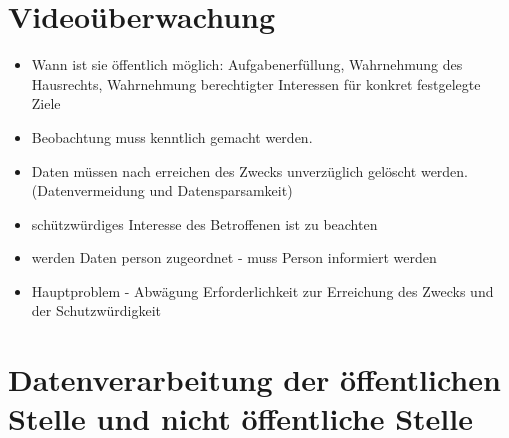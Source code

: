 \documentclass[a4paper,10pt]{scrartcl}
\begin{document}
\section{Videoüberwachung }

\begin{itemize}
 \item Wann ist sie öffentlich möglich: Aufgabenerfüllung, Wahrnehmung des Hausrechts, Wahrnehmung berechtigter Interessen 
 für konkret festgelegte Ziele
 \item Beobachtung muss kenntlich gemacht werden.
 \item Daten müssen nach erreichen des Zwecks unverzüglich gelöscht werden. (Datenvermeidung und Datensparsamkeit)
 \item schützwürdiges Interesse des Betroffenen ist zu beachten 
 \item werden Daten person zugeordnet - muss Person informiert werden
 \item Hauptproblem - Abwägung Erforderlichkeit zur Erreichung des Zwecks und der Schutzwürdigkeit
\end{itemize}



\section{ Datenverarbeitung der öffentlichen Stelle und nicht öffentliche Stelle}
\end{document}
